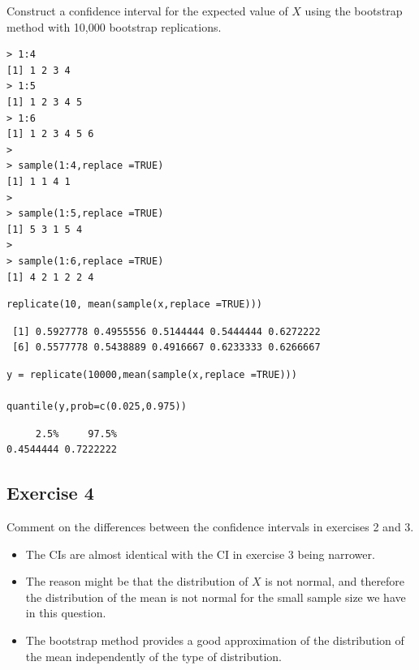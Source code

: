 \documentclass[a4paper,12pt]{article}
\begin{document}
\noindent Construct a confidence interval for the expected value of $X$ using the bootstrap
method with 10,000 bootstrap replications.

\begin{framed}
\begin{verbatim}
> 1:4
[1] 1 2 3 4
> 1:5
[1] 1 2 3 4 5
> 1:6
[1] 1 2 3 4 5 6
>
> sample(1:4,replace =TRUE)
[1] 1 1 4 1
>
> sample(1:5,replace =TRUE)
[1] 5 3 1 5 4
>
> sample(1:6,replace =TRUE)
[1] 4 2 1 2 2 4

\end{verbatim}
\end{framed}
\begin{framed}\begin{verbatim}
replicate(10, mean(sample(x,replace =TRUE)))
\end{verbatim} \end{framed}


\begin{verbatim}
 [1] 0.5927778 0.4955556 0.5144444 0.5444444 0.6272222
 [6] 0.5577778 0.5438889 0.4916667 0.6233333 0.6266667    
\end{verbatim}




\begin{framed}\begin{verbatim}
y = replicate(10000,mean(sample(x,replace =TRUE))) 

quantile(y,prob=c(0.025,0.975)) 

\end{verbatim} \end{framed}


\begin{verbatim}
     2.5%     97.5% 
0.4544444 0.7222222 
\end{verbatim}

\newpage


\subsection*{Exercise  4}

\noindent Comment on the differences between the confidence intervals in exercises 2 and 3.


\begin{itemize}
    \item The CIs are almost identical with the CI in exercise 3 being narrower. 
    \item The reason might be that the distribution of $X$ is not normal, and therefore the
distribution of the mean is not normal for the small sample size we have in this
question. 
    \item 


The bootstrap method provides a good approximation of the distribution of the mean
independently of the type of distribution.
\end{itemize}
\end{document}
